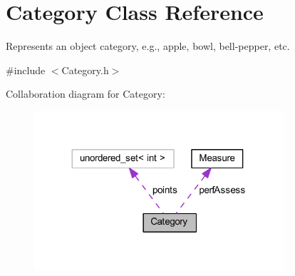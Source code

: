 \hypertarget{class_category}{}\section{Category Class Reference}
\label{class_category}


Represents an object category, e.\+g., apple, bowl, bell-\/pepper, etc.  




{\ttfamily \#include $<$Category.\+h$>$}



Collaboration diagram for Category\+:
\nopagebreak
\begin{figure}[H]
\begin{center}
\leavevmode
\includegraphics[width=263pt]{class_category__coll__graph}
\end{center}
\end{figure}
